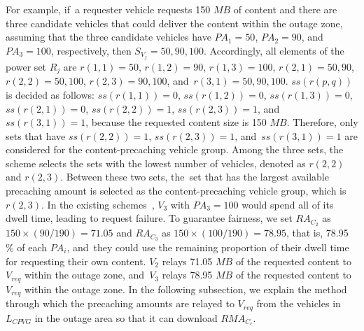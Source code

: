 \documentclass[sensors,aricle,accept,pdftex,moreauthors]{Definitions/mdpi}
\begin{document}
For example, if~a requester vehicle requests 150 $MB$ of content and there are three candidate vehicles that could deliver the content within the outage zone, assuming that the three candidate vehicles have $PA_{1}=50$, $PA_{2}=90$, and~$PA_{3}=100$, respectively, then $S_{V_{j}} = {50, 90, 100}$.
Accordingly, all elements of the power set $R_{j}$ are $r(1,1)={50}$, $r(1,2)={90}$, $r(1,3)={100}$, $r(2,1)={50,90}$, $r(2,2)={50, 100}$, $r(2,3)={90,100}$, and~$r(3,1)={50,90,100}$.
$ss(r(p,q))$ is decided as follows:
$ss(r(1,1)) = 0$, $ss(r(1,2)) = 0$, $ss(r(1,3)) = 0$, $ss(r(2,1)) = 0$, $ss(r(2,2)) = 1$, $ss(r(2,3)) = 1$, and~$ss(r(3,1)) = 1$, because the requested content size is 150 $MB$.
Therefore, only sets that have $ss(r(2,2)) = 1$, $ss(r(2,3)) = 1$, and~$ss(r(3,1)) = 1$ are considered for the content-precaching vehicle group.
Among the three sets, the scheme selects the sets with the lowest number of vehicles, {denoted} as $r(2,2)$ and $r(2,3)$.
Between these two sets, the~set that has the largest available precaching amount is selected as the content-precaching vehicle group, which is $r(2,3)$.
In the existing schemes~\cite{Ahmed2018}, {$V_{3}$ with $PA_{3}=100$ would spend all of its dwell time}, leading to request failure.
To guarantee fairness, we set $RA_{C_{2}}$ as $150 \times (90 / 190)= 71.05$ and $RA_{C_{3}}$ as $150 \times (100 / 190) = 78.95$, that is, 78.95 $\%$ of each $PA_{i}$, and~they could use the remaining proportion of their dwell time for requesting their own content.
$V_{2}$ relays 71.05 $MB$ of the requested content to $V_{req}$ within the outage zone, and~$V_{3}$ relays 78.95 $MB$ of the requested content to $V_{req}$ within the outage zone.
In the following subsection, we explain the method through which the precaching amounts are relayed to $V_{req}$ from the vehicles in $L_{CPVG}$ in the outage area so that it can download $RMA_{C_{c}}$.
\end{document}
